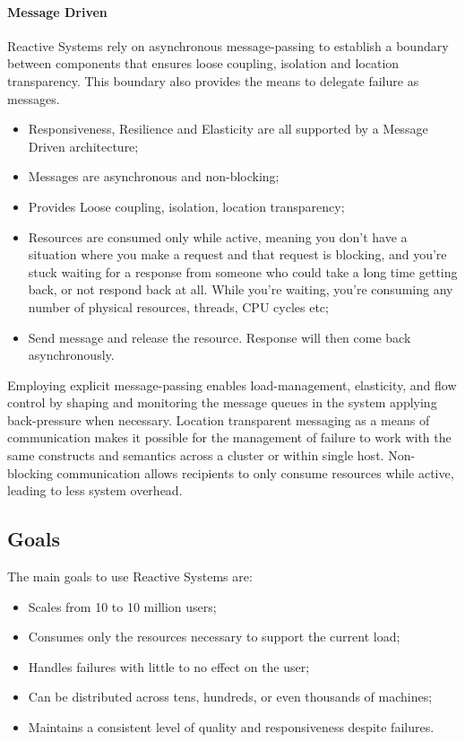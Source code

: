 \paragraph{Message Driven}
Reactive Systems rely on asynchronous message-passing to establish a boundary between components that ensures loose coupling, isolation and location transparency. This boundary also provides the means to delegate failure as messages.
\begin{itemize}
    \item Responsiveness, Resilience and Elasticity are all supported by a Message Driven architecture;
    \item Messages are asynchronous and non-blocking;
    \item Provides Loose coupling, isolation, location transparency;
    \item Resources are consumed only while active, meaning you don't have a situation where you make a request and that request is blocking, and you're stuck waiting for a response from someone who could take a long time getting back, or not respond back at all. While you're waiting, you're consuming any number of physical resources, threads, CPU cycles etc;
    \item Send message and release the resource. Response will then come back asynchronously.
\end{itemize}

Employing explicit message-passing enables load-management, elasticity, and flow control by shaping and monitoring the message queues in the system applying back-pressure when necessary. Location transparent messaging as a means of communication makes it possible for the management of failure to work with the same constructs and semantics across a cluster or within single host. Non-blocking communication allows recipients to only consume resources while active, leading to less system overhead.

\subsection{Goals}
The main goals to use Reactive Systems are:
\begin{itemize}
    \item Scales from 10 to 10 million users;
    \item Consumes only the resources necessary to support the current load;
    \item Handles failures with little to no effect on the user;
    \item Can be distributed across tens, hundreds, or even thousands of machines;
    \item Maintains a consistent level of quality and responsiveness despite failures.
\end{itemize}

